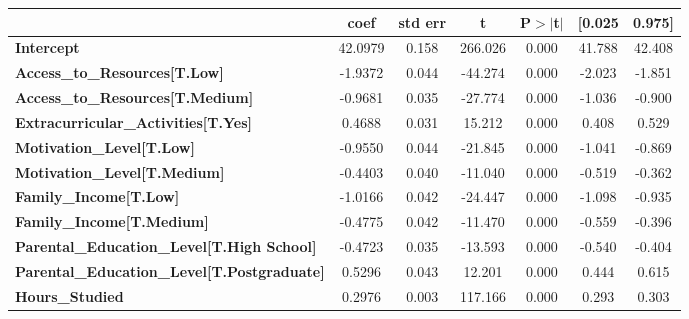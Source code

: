 \documentclass[twocolumn]{article} %
\begin{document}
\begin{figure}[ht]
  \begin{subtable}{\textwidth}
    \centering
    \begin{tabular}{lcccccc}
      & \textbf{coef} & \textbf{std err} & \textbf{t} & \textbf{P$> |$t$|$} & \textbf{[0.025} & \textbf{0.975]}  \\
      \midrule
      \textbf{Intercept}                                  &      42.0979  &        0.158     &   266.026  &         0.000        &       41.788    &       42.408     \\
      \textbf{Access\_to\_Resources[T.Low]}               &      -1.9372  &        0.044     &   -44.274  &         0.000        &       -2.023    &       -1.851     \\
      \textbf{Access\_to\_Resources[T.Medium]}            &      -0.9681  &        0.035     &   -27.774  &         0.000        &       -1.036    &       -0.900     \\
      \textbf{Extracurricular\_Activities[T.Yes]}         &       0.4688  &        0.031     &    15.212  &         0.000        &        0.408    &        0.529     \\
      \textbf{Motivation\_Level[T.Low]}                   &      -0.9550  &        0.044     &   -21.845  &         0.000        &       -1.041    &       -0.869     \\
      \textbf{Motivation\_Level[T.Medium]}                &      -0.4403  &        0.040     &   -11.040  &         0.000        &       -0.519    &       -0.362     \\
      \textbf{Family\_Income[T.Low]}                      &      -1.0166  &        0.042     &   -24.447  &         0.000        &       -1.098    &       -0.935     \\
      \textbf{Family\_Income[T.Medium]}                   &      -0.4775  &        0.042     &   -11.470  &         0.000        &       -0.559    &       -0.396     \\
      \textbf{Parental\_Education\_Level[T.High School]}  &      -0.4723  &        0.035     &   -13.593  &         0.000        &       -0.540    &       -0.404     \\
      \textbf{Parental\_Education\_Level[T.Postgraduate]} &       0.5296  &        0.043     &    12.201  &         0.000        &        0.444    &        0.615     \\
      \textbf{Hours\_Studied}                             &       0.2976  &        0.003     &   117.166  &         0.000        &        0.293    &        0.303     \\

\end{tabular}
\end{subtable}
\end{figure}
\end{document}
